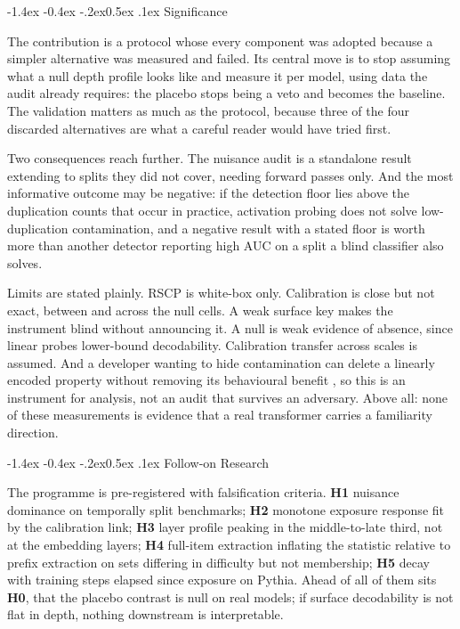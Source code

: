 \documentclass[10pt,letterpaper]{article}
\makeatletter
\renewcommand\section{\@startsection{section}{1}{\z@}%
  {-1.4ex \@plus -0.4ex \@minus -.2ex}{0.5ex \@plus .1ex}%
  {\normalfont\normalsize\bfseries}}
\makeatother
\begin{document}
\section{Significance}

The contribution is a protocol whose every component was adopted because a simpler alternative was measured and failed. Its central move is to stop assuming what a null depth profile looks like and measure it per model, using data the audit already requires: the placebo stops being a veto and becomes the baseline. The validation matters as much as the protocol, because three of the four discarded alternatives are what a careful reader would have tried first.

Two consequences reach further. The nuisance audit is a standalone result extending \citet{das2024blind} to splits they did not cover, needing forward passes only. And the most informative outcome may be negative: if the detection floor lies above the duplication counts that occur in practice, activation probing does not solve low-duplication contamination, and a negative result with a stated floor is worth more than another detector reporting high AUC on a split a blind classifier also solves.

Limits are stated plainly. RSCP is white-box only. Calibration is close but not exact, between \SlopeAAdjZero{} and \SlopeBAdjZero{} across the null cells. A weak surface key makes the instrument blind without announcing it. A null is weak evidence of absence, since linear probes lower-bound decodability. Calibration transfer across scales is assumed. And a developer wanting to hide contamination can delete a linearly encoded property without removing its behavioural benefit \cite{ravfogel2020inlp}, so this is an instrument for analysis, not an audit that survives an adversary. Above all: none of these measurements is evidence that a real transformer carries a familiarity direction.

\section{Follow-on Research}

The programme is pre-registered with falsification criteria. \textbf{H1} nuisance dominance on temporally split benchmarks; \textbf{H2} monotone exposure response fit by the calibration link; \textbf{H3} layer profile peaking in the middle-to-late third, not at the embedding layers; \textbf{H4} full-item extraction inflating the statistic relative to prefix extraction on sets differing in difficulty but not membership; \textbf{H5} decay with training steps elapsed since exposure on Pythia. Ahead of all of them sits \textbf{H0}, that the placebo contrast is null on real models; if surface decodability is not flat in depth, nothing downstream is interpretable.
\end{document}
